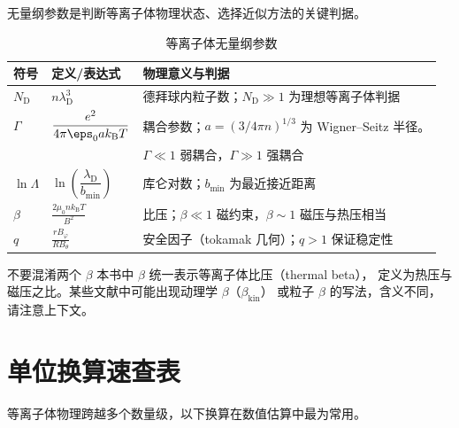 无量纲参数是判断等离子体物理状态、选择近似方法的关键判据。

\begin{table}[htbp]
\centering
\caption{等离子体无量纲参数}
\begin{tabular}{@{}llp{6.5cm}@{}}
\toprule
\textbf{符号} & \textbf{定义/表达式} & \textbf{物理意义与判据} \\
\midrule
$N_\mathrm{D}$ & $n\lambda_\mathrm{D}^3$ & 德拜球内粒子数；$N_\mathrm{D}\gg 1$ 为理想等离子体判据 \\
$\Gamma$ & $\displaystyle\frac{e^2}{4\pi\eps_0 a k_\mathrm{B} T}$ & 耦合参数；$a=(3/4\pi n)^{1/3}$ 为 Wigner--Seitz 半径。\\ & & $\Gamma\ll 1$ 弱耦合，$\Gamma\gg 1$ 强耦合 \\
$\ln\Lambda$ & $\ln\left(\dfrac{\lambda_\mathrm{D}}{b_{\min}}\right)$ & 库仑对数；$b_{\min}$ 为最近接近距离 \\
$\beta$ & $\displaystyle\frac{2\mu_0 n k_\mathrm{B} T}{B^2}$ & 比压；$\beta\ll 1$ 磁约束，$\beta\sim 1$ 磁压与热压相当 \\
$q$ & $\displaystyle\frac{r B_\varphi}{R B_\theta}$ & 安全因子（tokamak 几何）；$q>1$ 保证稳定性 \\
\bottomrule
\end{tabular}
\end{table}

\begin{warning}{不要混淆两个 $\beta$}{}
本书中 $\beta$ 统一表示等离子体比压（thermal beta），
定义为热压与磁压之比。某些文献中可能出现动理学 $\beta$（$\beta_{\mathrm{kin}}$）
或粒子 $\beta$ 的写法，含义不同，请注意上下文。
\end{warning}


\section*{单位换算速查表}

等离子体物理跨越多个数量级，以下换算在数值估算中最为常用。

